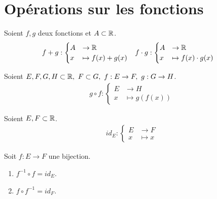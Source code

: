 \section{Opérations sur les fonctions}
\begin{definition}
	Soient $f, g$ deux fonctions et $A \subset \mathbb{R}$.
	\begin{align*}
		&f + g : 
        \begin{cases}
            A &\to \mathbb{R} \\
		        x &\mapsto f(x) + g(x)
        \end{cases}
        &
        &f \cdot g : 
        \begin{cases}
            A &\to \mathbb{R} \\
		            x &\mapsto f(x) \cdot g(x)
        \end{cases}
	\end{align*}
\end{definition}

\begin{definition}
	Soient $E, F, G, H \subset \mathbb{R},\ F \subset G,\ f : E \to F,\ g : G \to H$.
	\begin{align*}
		g \circ f : 
        \begin{cases}
            E &\to H \\
		            x &\mapsto g(f(x))
        \end{cases}
	\end{align*}
\end{definition}

\begin{definition}
    Soient $E, F \subset \mathbb{R}$.
	\begin{align*}
		id_E : 
        \begin{cases}
            E &\to F \\
		       x &\mapsto x
        \end{cases}
	\end{align*}
\end{definition}

\begin{proposition}
	Soit $f : E \to F$ une bijection.
    \begin{multicols}{2}
        \begin{enumerate}
            \item $f^{-1} \circ f = id_E$.
            \item $f \circ f^{-1} = id_F$.
        \end{enumerate}
    \end{multicols}
\end{proposition}

